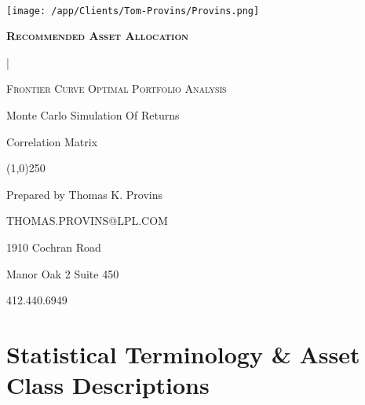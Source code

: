 \documentclass{article}
\begin{document}
\begin{titlepage}   %

\begin{center}
	{\scshape\Large\bfseries \, \par}
	\vspace{5cm}


	\texttt{[image: /app/Clients/Tom-Provins/Provins.png]}\par



	\vspace{0,5cm}
	{\scshape\Large\bfseries Recommended Asset Allocation

	{} | {} \par}
	\vspace{0,5cm}
	{\scshape\normalsize Frontier Curve Optimal Portfolio Analysis

	Monte Carlo Simulation Of Returns

	Correlation Matrix \par}
\end{center}

	\begin{center}
\line(1,0){250}
\end{center}

	\begin{center}
	 	{
		\small{
		Prepared by Thomas K. Provins

		THOMAS.PROVINS@LPL.COM}
		\par}


	\vfill
\end{center}

	\vfill

	{\begin{center}

	     1910 Cochran Road

	     Manor Oak 2 Suite 450

	     412.440.6949

	\end{center}}

\end{titlepage}


\tableofcontents    %

\begin{center}
\vfill
\vfill

\end{center}
\justify

\newpage    %

\section{Statistical Terminology \& Asset Class Descriptions}
\end{document}
